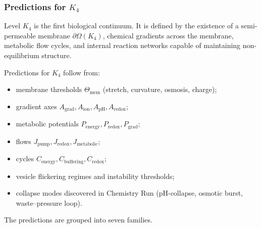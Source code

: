 

\subsubsection{Predictions for \texorpdfstring{$K_4$}{K_4}}
\label{sec:predictions-k4}

Level $K_4$ is the first biological continuum.  
It is defined by the existence of a semi-permeable membrane $\partial\Omega(K_4)$,
chemical gradients across the membrane, metabolic flow cycles, and internal
reaction networks capable of maintaining non-equilibrium structure.

Predictions for $K_4$ follow from:
\begin{itemize}
    \item membrane thresholds $\Theta_{\mathrm{mem}}$ (stretch, curvature, osmosis, charge);
    \item gradient axes $A_{\mathrm{grad}},A_{\mathrm{ion}},A_{\mathrm{pH}},A_{\mathrm{redox}}$;
    \item metabolic potentials $P_{\mathrm{energy}},P_{\mathrm{redox}},P_{\mathrm{grad}}$;
    \item flows $J_{\mathrm{pump}},J_{\mathrm{redox}},J_{\mathrm{metabolic}}$;
    \item cycles $C_{\mathrm{energy}},C_{\mathrm{buffering}},C_{\mathrm{redox}}$;
    \item vesicle flickering regimes and instability thresholds;
    \item collapse modes discovered in Chemistry Run (pH-collapse, osmotic burst, waste–pressure loop).
\end{itemize}

The predictions are grouped into seven families.

